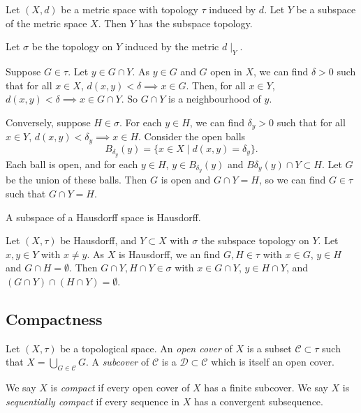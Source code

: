 \documentclass[12pt]{article}
\begin{document}
\begin{proposition}
	Let $(X, d)$ be a metric space with topology $\tau$ induced by $d$. Let $Y$ be a subspace of the metric space $X$. Then $Y$ has the subspace topology.
\end{proposition}

\begin{proofbox}
	Let $\sigma$ be the topology on $Y$ induced by the metric $d\mid_{Y}$.

	Suppose $G \in \tau$. Let $y \in G \cap Y$. As $y \in G$ and $G$ open in $X$, we can find $\delta > 0$ such that for all $x \in X$, $d(x, y) < \delta \implies x \in G$. Then, for all $x \in Y$, $d(x, y) < \delta \implies x \in G \cap Y$. So $G \cap Y$ is a neighbourhood of $y$.

	Conversely, suppose $H \in \sigma$. For each $y \in H$, we can find $\delta_y > 0$ such that for all $x \in Y$, $d(x, y) < \delta_y \implies x \in H$. Consider the open balls
	\[
		B_{\delta_y}(y) = \{x \in X \mid d(x, y) = \delta_y\}
	.\]
	Each ball is open, and for each $y \in H$, $y \in B_{\delta_y}(y)$ and $B \delta_y(y) \cap Y \subset H$. Let $G$ be the union of these balls. Then $G$ is open and $G \cap Y = H$, so we can find $G \in \tau$ such that $G \cap Y = H$.
\end{proofbox}

\begin{proposition}
	A subspace of a Hausdorff space is Hausdorff.
\end{proposition}

\begin{proofbox}
	Let $(X, \tau)$ be Hausdorff, and $Y \subset X$ with $\sigma$ the subspace topology on $Y$. Let $x, y \in Y$ with $x \neq y$. As $X$ is Hausdorff, we an find $G, H \in \tau$ with $x \in G$, $y \in H$ and $G \cap H = \emptyset$. Then $G \cap Y, H \cap Y \in \sigma$ with $x \in G \cap Y$, $y \in H \cap Y$, and $(G \cap Y) \cap (H \cap Y) = \emptyset$.
\end{proofbox}

\subsection{Compactness}%
\label{sub:compactness}

\begin{definition}
	Let $(X, \tau)$ be a topological space. An \textit{open cover} of $X$ is a subset $\mathcal{C} \subset \tau$ such that $X = \bigcup_{G \in \mathcal{C}}G$. A \textit{subcover} of $\mathcal{C}$ is a $\mathcal{D} \subset \mathcal{C}$ which is itself an open cover.

	We say $X$ is \textit{compact} if every open cover of $X$ has a finite subcover. We say $X$ is \textit{sequentially compact} if every sequence in $X$ has a convergent subsequence.
\end{definition}
\end{document}
